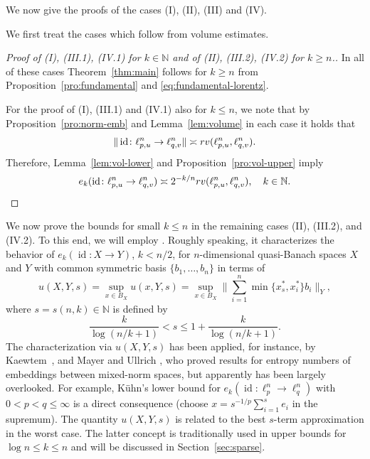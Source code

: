 \documentclass[a4paper,12pt]{article}
\theoremstyle{definition}
\newcommand{\IN}{\mathbb{N}}
\DeclareMathOperator{\id}{id}
\begin{document}
We now give the proofs of the cases (I), (II), (III) and (IV).

We first treat the cases which follow from volume estimates. 

\begin{proof}[Proof of (I), (III.1), (IV.1) for $k\in\IN$ and of (II), (III.2), (IV.2) for $k\ge n$.]

In all of these cases Theorem~\ref{thm:main} follows for $k\ge n$ from Proposition~\ref{pro:fundamental} and \eqref{eq:fundamental-lorentz}.

	For the proof of (I), (III.1) and (IV.1) also for $k\le n$, we note that by Proposition~\ref{pro:norm-emb} and Lemma~\ref{lem:volume} in each case it holds that
\[
\|\id\colon \ell_{p,u}^n\to\ell_{q,v}^n\|
\asymp {\rm rv}(\ell_{p,u}^n,\ell_{q,v}^n).
\]
Therefore, Lemma~\ref{lem:vol-lower} and Proposition~\ref{pro:vol-upper} imply
\[
e_k(\id\colon \ell_{p,u}^n\to \ell_{q,v}^n) \asymp 2^{-k/n}{\rm rv}(\ell_{p,u}^n,\ell_{q,v}^n),\quad k\in\IN.
\]
\end{proof}

We now prove the bounds for small $k\le n$ in the remaining cases (II), (III.2), and (IV.2). 
To this end, we will employ \cite[Section 4, Theorem 2]{EN98}. Roughly speaking, it characterizes the behavior of $e_k(\id\colon X\to Y)$, $k<n/2$, for $n$-dimensional quasi-Banach spaces $X$ and $Y$ with common symmetric basis $\{b_1,\dots,b_n\}$ in terms of 
\begin{equation} \label{eq:u-def}
u(X,Y,s)
=\sup_{x\in B_X}u(x,Y,s)
=\sup_{x\in B_X} \Big\| \sum_{i=1}^{n}\min\{x_s^*,x_i^*\}b_i\Big\|_{Y},
\end{equation}
where $s=s(n,k)\in\IN$ is defined by
\begin{equation} \label{eq:s-def}
\frac{k}{\log(n/k+1)}<s\le 1+\frac{k}{\log(n/k+1)}.
\end{equation}
The characterization via $u(X,Y,s)$ has been applied, for instance, by Kaewtem~\cite{Kae17}, and Mayer and Ullrich \cite{MU21}, who proved results for entropy numbers of embeddings between mixed-norm spaces, but apparently has been largely overlooked.
For example, K\"uhn's lower bound \cite{Kue01} for $e_k(\id\colon \ell_p^n\to \ell_q^n)$ with $0<p<q\le \infty$   is a direct consequence (choose $x=s^{-1/p}\sum_{i=1}^{s}e_i$ in the supremum).  The quantity $u(X,Y,s)$ is related to the best $s$-term approximation in the worst case.
The latter concept is traditionally used in upper bounds for $\log n\le k\le n$ and will be discussed in Section~\ref{sec:sparse}.
\end{document}
